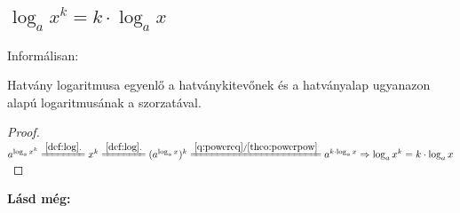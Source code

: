 \subsection{
\texorpdfstring
  {$\log_{a}x^k = k \cdot \log_{a}x$}
  {log\textunderscore{}a(x**k) = k * log\textunderscore{}a(x)}
}

Informálisan:

Hatvány logaritmusa egyenlő a hatványkitevőnek és a hatványalap ugyanazon alapú
logaritmusának a szorzatával.

\begin{proof}
$
  a^{\log_{a}x^k}
    \xlongequal{\ref{def:log}.}
  x^k
    \xlongequal{\ref{def:log}.}
  (a^{\log_{a}x})^k
    \xlongequal{\ref{q:powereq}/\ref{theo:powerpow}}
  a^{k \cdot \log_{a}x}
    \Rightarrow
  \log_{a}x^k = k \cdot \log_{a}x
$
\end{proof}	

\textbf{Lásd még:}
